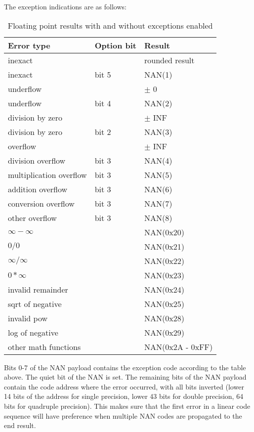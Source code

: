 \documentclass[forwardcom.tex]{subfiles}
\begin{document}
The exception indications are as follows:

\begin{longtable}
{|p{55mm}|p{20mm}|p{50mm}|}
\caption{Floating point results with and without exceptions enabled}
\label{table:FPExceptionResults}
\endfirsthead
\endhead
\hline
\bfseries Error type & \bfseries Option bit & \bfseries Result \\ \hline
inexact & & rounded result \\
inexact & bit 5 & NAN(1) \\
underflow & & $\pm$ 0 \\
underflow & bit 4 & NAN(2) \\
division by zero &  & $\pm$ INF \\
division by zero & bit 2 & NAN(3) \\
overflow & & $\pm$ INF \\
division overflow & bit 3 & NAN(4) \\
multiplication overflow & bit 3 & NAN(5) \\
addition overflow & bit 3 & NAN(6) \\
conversion overflow & bit 3 & NAN(7) \\
other overflow & bit 3 & NAN(8) \\
$\infty - \infty$ &  & NAN(0x20) \\
$0 / 0$  &  & NAN(0x21) \\
$\infty / \infty$ &  & NAN(0x22) \\ 
$0 * \infty$ &  & NAN(0x23) \\ 
invalid remainder & & NAN(0x24) \\
sqrt of negative & & NAN(0x25) \\
invalid pow & & NAN(0x28) \\
log of negative & & NAN(0x29) \\
other math functions & & NAN(0x2A - 0xFF) \\
\hline
\end{longtable}

Bits 0-7 of the NAN payload contains the exception code according to the table above. 
The quiet bit of the NAN is set. The remaining bits of the NAN payload contain the code address where the error occurred, with all bits inverted (lower 14 bits of the address for single precision, lower 43 bits for double precision, 64 bits for quadruple precision). This makes sure that the first error in a linear code sequence will have preference when multiple NAN codes are propagated to the end result.
\vspace{2mm}
\end{document}
